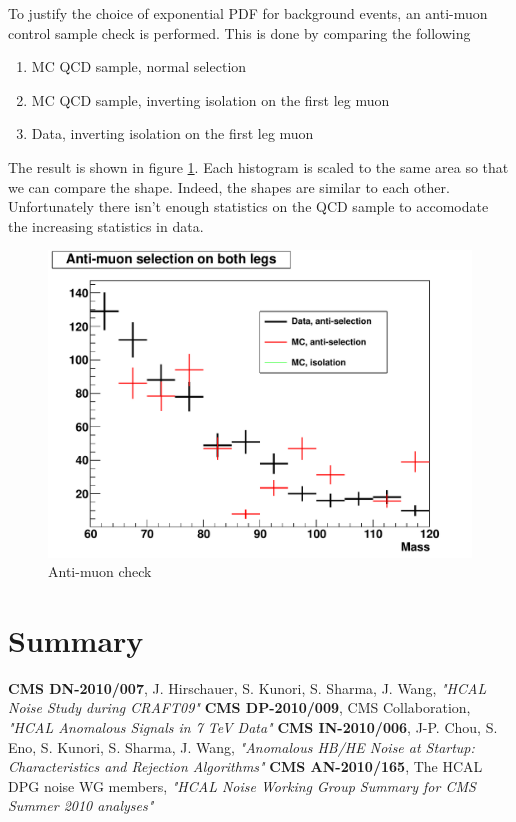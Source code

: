 \documentclass{cmspaper2}
\begin{document}
To justify the choice of exponential PDF for background events, an anti-muon control sample check is performed.
This is done by comparing the following

\begin{enumerate}
\item MC QCD sample, normal selection
\item MC QCD sample, inverting isolation on the first leg muon
\item Data, inverting isolation on the first leg muon
\end{enumerate}

The result is shown in figure \ref{Figure_AntiMuonSingleLeg}.  Each histogram is scaled to the same area so that we can compare the shape.
Indeed, the shapes are similar to each other.  Unfortunately there isn't enough statistics on the QCD sample to accomodate the increasing statistics in data.

\begin{figure}[hbtp]
\begin{center}
\includegraphics[width=150mm]{DoubleLegAntiMuon}
\caption{Anti-muon check}
\label{Figure_AntiMuonSingleLeg}
\end{center}
\end{figure}


\section{Summary}


\begin{thebibliography}{9}
    {\bf CMS DN-2010/007},
      J. Hirschauer, S. Kunori, S. Sharma, J. Wang,
      {\em "HCAL Noise Study during CRAFT09"}
    {\bf CMS DP-2010/009},
      CMS Collaboration,
      {\em "HCAL Anomalous Signals in 7 TeV Data"}
    {\bf CMS IN-2010/006},
      J-P. Chou, S. Eno, S. Kunori, S. Sharma, J. Wang,
      {\em "Anomalous HB/HE Noise at Startup: Characteristics and Rejection Algorithms"}
    {\bf CMS AN-2010/165},
      The HCAL DPG noise WG members,
      {\em "HCAL Noise Working Group Summary for CMS Summer 2010 analyses"}
\end{thebibliography}
 
\pagebreak
\end{document}
